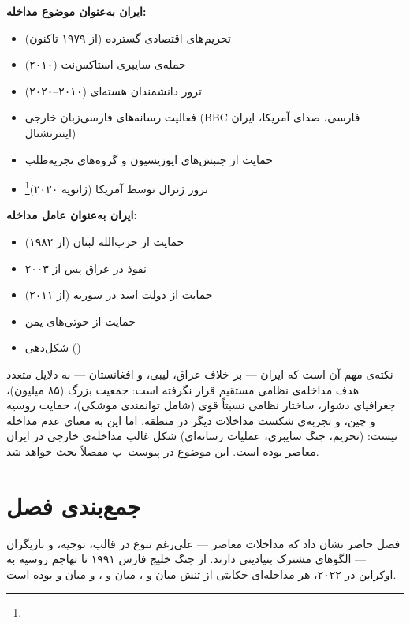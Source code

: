 {\begin{tcolorbox}[casebox, title={ایران: هم‌ موضوع، هم عامل مداخله}]
\textbf{ایران به‌عنوان موضوع مداخله:}
\begin{itemize}
\item تحریم‌های اقتصادی گسترده (از ۱۹۷۹ تاکنون)
\item حمله‌ی سایبری استاکس‌نت (۲۰۱۰)
\item ترور دانشمندان هسته‌ای (۲۰۱۰–۲۰۲۰)
\item فعالیت رسانه‌های فارسی‌زبان خارجی (BBC فارسی، صدای آمریکا، ایران اینترنشنال)
\item حمایت از جنبش‌های اپوزیسیون و گروه‌های تجزیه‌طلب
\item ترور ژنرال  توسط آمریکا (ژانویه ۲۰۲۰)\footnote{}
\end{itemize}

\textbf{ایران به‌عنوان عامل مداخله:}
\begin{itemize}
\item حمایت از حزب‌الله لبنان (از ۱۹۸۲)
\item نفوذ در عراق پس از ۲۰۰۳
\item حمایت از دولت اسد در سوریه (از ۲۰۱۱)
\item حمایت از حوثی‌های یمن
\item شکل‌دهی  ()
\end{itemize}
\end{tcolorbox}

نکته‌ی مهم آن است که ایران — بر خلاف عراق، لیبی، و افغانستان — به دلایل متعدد هدف مداخله‌ی نظامی مستقیم قرار نگرفته است: جمعیت بزرگ (۸۵ میلیون)، جغرافیای دشوار، ساختار نظامی نسبتاً قوی (شامل توانمندی موشکی)، حمایت روسیه و چین، و تجربه‌ی شکست مداخلات دیگر در منطقه. اما این به معنای عدم مداخله نیست:  (تحریم، جنگ سایبری، عملیات رسانه‌ای) شکل غالب مداخله‌ی خارجی در ایران معاصر بوده است. این موضوع در پیوست~پ مفصلاً بحث خواهد شد.


\section{جمع‌بندی فصل}
\label{sec:ch10-conclusion}

فصل حاضر نشان داد که مداخلات معاصر — علی‌رغم تنوع در قالب، توجیه، و بازیگران — الگوهای مشترک بنیادینی دارند. از جنگ خلیج فارس ۱۹۹۱ تا تهاجم روسیه به اوکراین در ۲۰۲۲، هر مداخله‌ای حکایتی از تنش میان  و ، میان  و ، و میان  و  بوده است.

}
